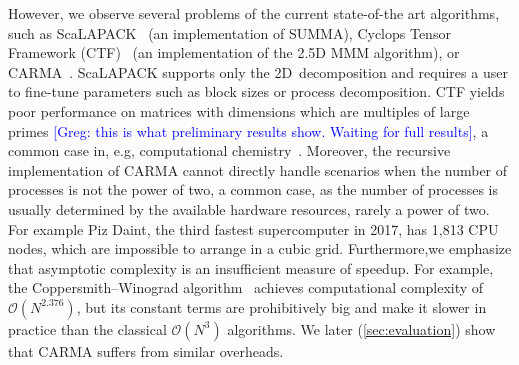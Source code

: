 \documentclass[sigplan,review,anonymous]{acmart}\settopmatter{printfolios=true,printccs=false,printacmref=false}
\newcommand\greg[1]{\textcolor{blue}{[Greg: #1]}}
\newcommand\mac[1]{\textcolor{red}{[Mac: #1]}}
\begin{document}

%

However, we observe several problems of the current state-of-the art
algorithms, such as ScaLAPACK~\cite{scalapack} (an implementation of
SUMMA), Cyclops Tensor Framework (CTF)~\cite{cyclops} (an implementation of the 
2.5D MMM algorithm), or CARMA~\cite{CARMA}. ScaLAPACK supports
only the 2D~decomposition  and requires a user to
fine-tune parameters such as block sizes or process
decomposition. CTF yields poor performance on matrices with 
dimensions which are multiples of large primes
\greg{this is what preliminary results show. Waiting for full results}, a 
common case in, e.g,
computational chemistry~\cite{joost}. Moreover, the recursive
implementation of CARMA cannot directly handle scenarios when the number of
processes is not the power of two, a common
case, as the number of processes is usually determined by the available
hardware resources, rarely a power of two.  For example Piz Daint, the
third fastest supercomputer in 2017, has 1,813 CPU nodes, which are
impossible to arrange in a cubic grid. Furthermore,we emphasize that asymptotic 
complexity is an insufficient measure of speedup. For example, the
Coppersmith--Winograd algorithm~\cite{coppersmith} achieves computational
complexity of $\mathcal{O}(N^{2.376})$, but its constant terms are 
prohibitively big and
make it slower in practice than the classical $\mathcal{O}(N^{3})$ algorithms. 
We later (\cref{sec:evaluation}) show that CARMA suffers from similar
overheads.




\end{document}
